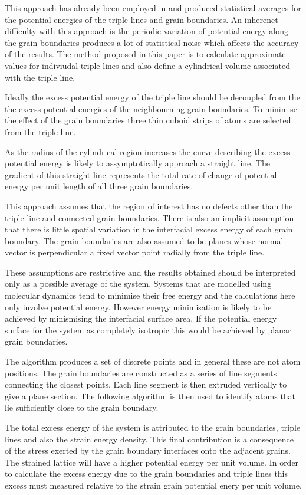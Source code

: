 \documentclass[12pt,a4paper]{book}
\begin{document}
This approach has already been employed in \citep{Srinivasan1999}   
and produced statistical averages for the potential energies of the triple lines and grain boundaries. An inherenet difficulty with this approach is the periodic variation of potential energy along the grain boundaries produces a lot of statistical noise which affects the accuracy of the results. The method proposed in this paper is to calculate approximate values for indiviudal triple lines and also define a cylindrical volume associated with the triple line.

Ideally the excess potential energy of the triple line should be decoupled from the the excess potential energies of the neighbourning grain boundaries. To minimise the effect of the grain boundaries three thin cuboid strips of atoms are selected from the triple line.  


As the radius of the cylindrical region increases the curve describing the excess potential energy is likely to assymptotically approach a straight line. The gradient of this straight line represents the total rate of change of potential energy per unit length of all three grain boundaries. 

This approach assumes that the region of interest has no defects other than the triple line and connected grain boundaries. There is also an implicit assumption that there is little spatial variation in the interfacial excess energy of each grain boundary. The grain boundaries are also assumed to be planes whose normal vector is perpendicular a fixed vector point radially from the triple line.

These assumptions are restrictive and the results obtained should be interpreted only as a possible average of the system. Systems that are modelled using molecular dynamics tend to minimise their free energy and the calculations here only involve potential energy. However energy minimisation is likely to be achieved by minismising the interfacial surface area. If the potential energy surface for the system as completely isotropic this would be achieved by planar grain boundaries.    

The algorithm produces a set of discrete points and in general these are not atom positions. The grain boundaries are constructed as a series of line segments connecting the closest points. Each line segment is then extruded vertically to give a plane section. The following algorithm is then used to identify atoms that lie sufficiently close to the grain boundary.

The total excess energy of the system is attributed to the grain boundaries, triple lines and also the strain energy density. This final contribution is a consequence of the stress exerted by the grain boundary interfaces onto the adjacent grains. The strained lattice will have a higher potential energy per unit volume. In order to calculate the excess energy due to the grain boundaries and triple lines this excess must measured relative to the strain grain potential enery per unit volume. 
\end{document}
